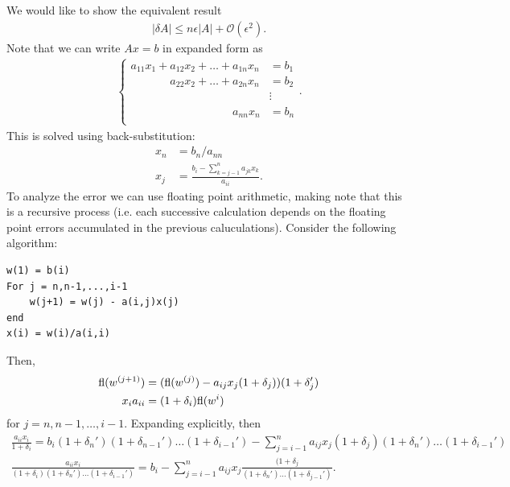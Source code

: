 We would like to show the equivalent result
\begin{eqnarray}
    \label{eq:res-b}
    | \delta A | \leq n\epsilon | A | + \mathcal{O}(\epsilon^2)
.\end{eqnarray}
Note that we can write $Ax = b$ in expanded form as
\begin{eqnarray}
    \label{eq:expand-Axb}
    \begin{cases}
        a_{11} x_1 + a_{12} x_2 + \ldots + a_{1n} x_{n} &= b_{1} \\
        \phantom{a_{11} x_1 +} a_{22} x_2 + \ldots + a_{2n} x_{n} &= b_{2} \\
        \phantom{a_{11} x_1 + a_{22} x_2 + \ldots + a_{2n} x_{n}} &\vdots \\
        \phantom{a_{11} x_1 + a_{22} x_2 + \ldots + } a_{nn} x_{n} &= b_{n} \\
    \end{cases} 
.\end{eqnarray}
This is solved using back-substitution:
\begin{align}
    \label{eq:back-sub}
    x_{n} &= b_{n}/a_{nn} \\
    x_{j} &= \frac{b_{i} - \sum_{k=j-1}^{n} a_{jk} x_{k}}{a_{ii}}
.\end{align}
To analyze the error we can use floating point arithmetic, making note that this is a recursive process (i.e. each successive calculation depends on the floating point errors accumulated in the previous caluculations).
Consider the following algorithm:
\begin{verbatim}
w(1) = b(i) 
For j = n,n-1,...,i-1
    w(j+1) = w(j) - a(i,j)x(j)
end
x(i) = w(i)/a(i,i)
\end{verbatim}
Then,
\begin{align}
    \label{eq:float-calc}
    {\rm fl}(w^{(j+1)}) &= ({\rm fl}(w^{(j)}) - a_{ij}x_{j}(1 + \delta_{j}))(1 + \delta_{j}') \\
    x_{i} a_{ii} &= (1 + \delta_{i}) {\rm fl}(w^{i})
\end{align}
for $j = n,n-1,\ldots,i-1$.
Expanding  explicitly, then
\begin{gather}
    \label{eq:float-calc-expand}
    \frac{a_{ii}x_{i}}{1 + \delta_{i}} = b_{i}(1 + \delta_{n}')(1 + \delta_{n-1}')\hdots(1+\delta_{i-1}') - \sum_{j=i-1}^{n} a_{ij} x_{j} (1 + \delta_{j})(1+\delta_{n}')\hdots(1+\delta_{i-1}') \\
    \frac{a_{ii}x_{i}}{(1 + \delta_{i})(1+\delta_{n}')\hdots(1+\delta_{i-1}')} = b_{i} - \sum_{j=i-1}^{n} a_{ij} x_{j} \frac{(1 + \delta_{j}}{(1+\delta_{n}')\hdots(1+\delta_{j-1}')}
.\end{gather}

